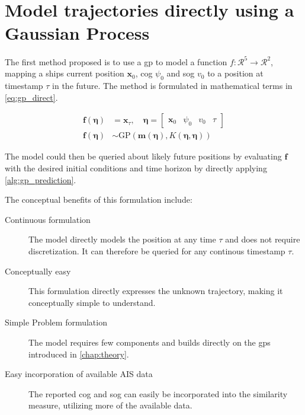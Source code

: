 \chapter{Model trajectories directly using a Gaussian Process}\label{chap:direct_gp}
The first method proposed is to use a \acrshort{gp} to model a function $f: \mathcal{R}^5 \to \mathcal{R}^2$, mapping a ships current position $\boldsymbol{x}_0$, \acrshort{cog} $\psi_0$ and \acrshort{sog} $v_0$ to a position at timestamp $\tau$ in the future. The method is formulated in mathematical terms in \cref{eq:gp_direct}. 

\begin{subequations}\label{eq:gp_direct}
\begin{align}
    \boldsymbol{f}(\boldsymbol{\eta}) &= \boldsymbol{x}_{\tau} \label{eq:gp_direct_f}, \quad \boldsymbol{\eta} = \begin{bmatrix} \boldsymbol{x}_0 & \psi_0 & v_0 & \tau\end{bmatrix}\\
    \boldsymbol{f}(\boldsymbol{\eta}) &\sim \text{GP}(\boldsymbol{m}(\boldsymbol{\eta}), K(\boldsymbol{\eta}, \boldsymbol{\eta}))\label{eq:gp_direct_f_dist}
\end{align} 
\end{subequations}

The model could then be queried about likely future positions by evaluating $\boldsymbol{f}$ with the desired initial conditions and time horizon by directly applying \cref{alg:gp_prediction}. 

The conceptual benefits of this formulation include:
\begin{description}
    \item[Continuous formulation] The model directly models the position at any time $\tau$ and does not require discretization. It can therefore be queried for any continous timestamp $\tau$.
    \item[Conceptually easy] This formulation directly expresses the unknown trajectory, making it conceptually simple to understand.
    \item[Simple Problem formulation] The model requires few components and builds directly on the \acrshort{gp}s introduced in \cref{chap:theory}.
    \item[Easy incorporation of available AIS data] The reported \acrshort{cog} and \acrshort{sog} can easily be incorporated into the similarity measure, utilizing more of the available data.
\end{description}

